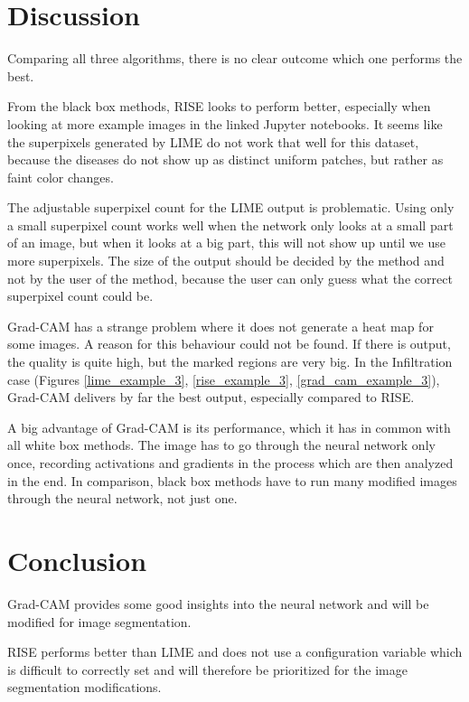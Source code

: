 \section{Discussion}
Comparing all three algorithms, there is no clear outcome which one performs the best.

From the black box methods, RISE looks to perform better, especially when looking at more example images in the linked Jupyter notebooks. It seems like
the superpixels generated by LIME do not work that well for this dataset, because the diseases do not show up as distinct uniform patches, but rather as faint color changes.

The adjustable superpixel count for the LIME output is problematic. Using only a small superpixel count works well when the network only looks at a small part of an image, but when it looks
at a big part, this will not show up until we use more superpixels. The size of the output should be decided by the method and not by the user of the method, because the user can only guess what
the correct superpixel count could be.

Grad-CAM has a strange problem where it does not generate a heat map for some images. A reason for this behaviour could not be found. If there is output,
the quality is quite high, but the marked regions are very big. In the Infiltration case (Figures \ref{lime_example_3}, \ref{rise_example_3}, \ref{grad_cam_example_3}), Grad-CAM delivers by far
the best output, especially compared to RISE.

A big advantage of Grad-CAM is its performance, which it has in common with all white box methods. The image has to go through the neural network only once, recording activations and gradients in the process which are then analyzed in the end. In comparison, black box methods have to run many modified images through the neural network, not just one.

\section{Conclusion}
Grad-CAM provides some good insights into the neural network and will be modified for image segmentation.

RISE performs better than LIME and does not use a configuration variable which is difficult to correctly set and will therefore be prioritized for the image segmentation modifications.
